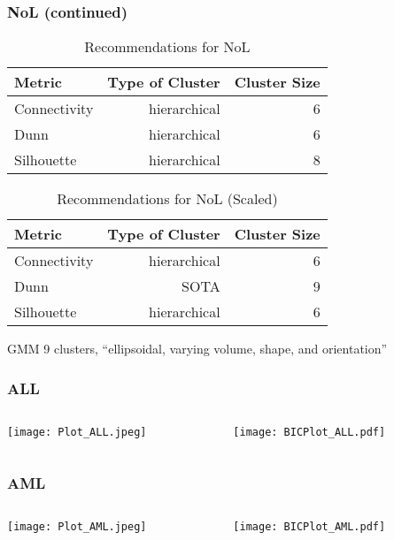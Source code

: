 \documentclass[10pt,dvipsnames,table, handout]{beamer} %
\begin{document}
\begin{frame}
\frametitle{NoL (continued)}
\begin{table}[H]
\centering
\begin{tabular}{l|r|r}
\hline
Metric & Type of Cluster & Cluster Size \\ 
\hline
Connectivity & hierarchical & 6 \\
Dunn & hierarchical & 6 \\
Silhouette & hierarchical & 8 \\
\hline
\end{tabular}
\caption{Recommendations for NoL}
\end{table}

\begin{table}[H]
\centering
\begin{tabular}{l|r|r}
\hline
Metric & Type of Cluster & Cluster Size \\ 
\hline
Connectivity & hierarchical & 6 \\
Dunn & SOTA & 9 \\
Silhouette & hierarchical & 6 \\
\hline
\end{tabular}
\caption{Recommendations for NoL (Scaled)}
\end{table}

\begin{block}{GMM}
9 clusters, ``ellipsoidal, varying volume, shape, and orientation''
\end{block}
\end{frame}

\begin{frame}
\frametitle{ALL}
\begin{columns}
\begin{column}{5cm}
\texttt{[image: Plot\_ALL.jpeg]} \\
\end{column}
\begin{column}{5cm}
\pause \texttt{[image: BICPlot\_ALL.pdf]} \\
\end{column}
\end{columns}
\end{frame}

\begin{frame}
\frametitle{AML}
\begin{columns}
\begin{column}{5cm}
\texttt{[image: Plot\_AML.jpeg]} \\
\end{column}
\begin{column}{5cm}
\pause \texttt{[image: BICPlot\_AML.pdf]} \\
\end{column}
\end{columns}
\end{frame}
\end{document}
